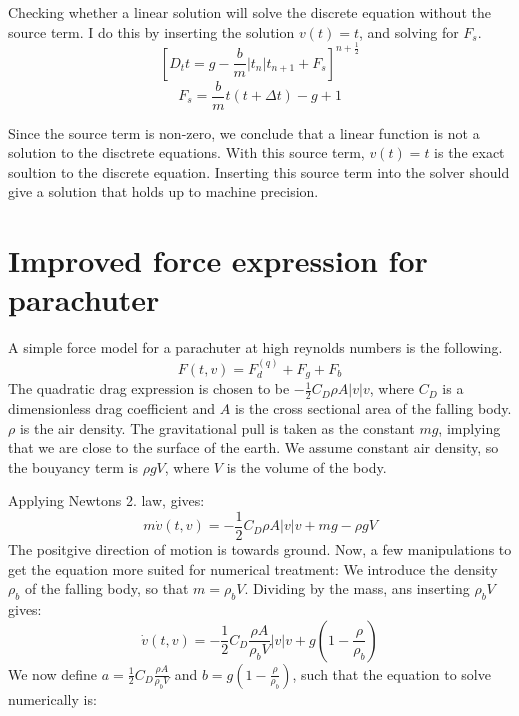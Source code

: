 \documentclass[a4paper, 10pt]{article}
\begin{document}
Checking whether a linear solution will solve the discrete equation without the source term. I do this by inserting the solution $v(t) = t$, and solving for $F_s$.  
\begin{equation}
	\left[D_t t = g - \frac{b}{m} |t_n|t_{n+1} + F_s\right]^{n+\frac{1}{2}}
\end{equation}
\begin{equation}
	F_s = \frac{b}{m} t(t+\Delta t) - g + 1 
\end{equation}

Since the source term is non-zero, we conclude that a linear function is not a solution to the disctrete equations. With this source term, $v(t) = t$ is the exact soultion to the discrete equation. Inserting this source term into the solver should give a solution that holds up to machine precision. 

\section{Improved force expression for parachuter}
A simple force model for a parachuter at high reynolds numbers is the following.
\begin{equation}
	F(t, v) = F_d^{(q)} + F_g + F_b
\end{equation}
The quadratic drag expression is chosen to be $-\frac{1}{2}C_D \rho A |v|v$, where $C_D$ is a dimensionless drag coefficient and $A$ is the cross sectional area of the falling body. $\rho$ is the air density. The gravitational pull is taken as the constant $mg$, implying that we are close to the surface of the earth. We assume constant air density, so the bouyancy term is $\rho g V$, where $V$ is the volume of the body. 

Applying Newtons 2. law, gives:
\begin{equation}
	m\dot{v}(t, v) = -\frac{1}{2}C_D \rho A |v|v + mg - \rho g V
\end{equation}
The positgive direction of motion is towards ground.
Now, a few manipulations to get the equation more suited for numerical treatment:
We introduce the density $\rho_b$ of the falling body, so that $m = \rho_b V$. Dividing by the mass, ans inserting $\rho_b V$ gives:
\begin{equation}
	\dot{v}(t, v) = -\frac{1}{2} C_D \frac{\rho A}{\rho_b V}|v|v + g\left( 1- \frac{\rho}{\rho_b} \right) 
\end{equation}
We now define 
$a = \frac{1}{2} C_D \frac{\rho A}{\rho_b V}$ 
and 
$b = g\left( 1- \frac{\rho}{\rho_b}\right)$, 
such that the equation to solve numerically is:
\end{document}
